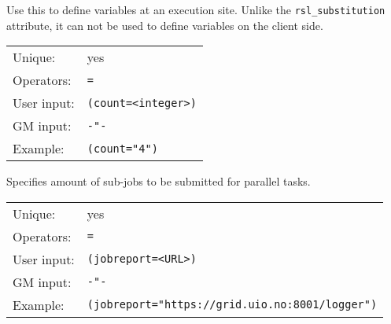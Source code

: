   Use this to define variables at an execution site. Unlike the
  \texttt{rsl\_substitution} attribute, it can not be used to define
  variables on the client side.



  \hspace*{0.5cm}
  \begin{shaded}
  \end{shaded}
  \begin{tabular}{lp{13cm}}
    Unique:&yes\\
    Operators:&\verb#=#\\
    User input:&\verb#(count=<integer>)#\\
    GM input:&\verb#-"-#\\
    Example:&\verb#(count="4")#\\
  \end{tabular}

  Specifies amount of sub-jobs to be submitted for parallel tasks.

  \hspace*{0.5cm}
  \begin{shaded}
  \end{shaded}
  \begin{tabular}{lp{13cm}}
    Unique:&yes\\
    Operators:&\verb#=#\\
    User input:&\verb#(jobreport=<URL>)#\\
    GM input:&\verb#-"-#\\
    Example:&\verb#(jobreport="https://grid.uio.no:8001/logger")#\\
  \end{tabular}

